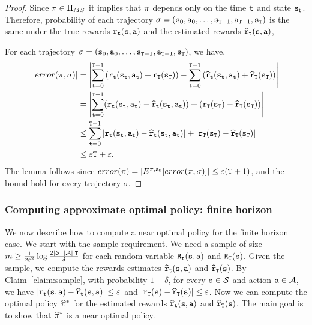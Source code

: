 \begin{proof}
Since $\pi\in  {\Pi _{MS}}$ it implies that $\pi$ depends
only on the time ${\tt t}$ and state ${\tt s}_{\tt t}$.
%
Therefore, probability of each trajectory
$\sigma=({\tt s}_0,{\tt a}_0,\ldots,
{\tt s}_{{\tt T}-1},{\tt a}_{{\tt T}-1},{\tt s}_{\tt T})$ is the
same under the true rewards ${\tt r}_{\tt t}({\tt s},{\tt a})$ and the
estimated rewards $\widehat{{\tt r}}_{\tt t}({\tt s},{\tt a})$,

For each trajectory $\sigma=({\tt s}_0,{\tt a}_0,\ldots,
{\tt s}_{{\tt T}-1},{\tt a}_{{\tt T}-1},{\tt s}_{\tt T})$, we
have,
\begin{align*}
\left|error(\pi,\sigma)\right| &= \left|\sum_{{\tt t}=0}^{{\tt T}-1}
\left({\tt r}_{\tt t}({\tt s}_{\tt t},{\tt a}_{\tt t})+{\tt r}_{\tt T}({\tt s}_{\tt T})\right)
-\sum_{{\tt t}=0}^{{\tt T}-1}
\left(\widehat{{\tt r}}_{\tt t}({\tt s}_{\tt t},{\tt a}_{\tt t})+\widehat{{\tt r}}_{\tt T}({\tt s}_{\tt T})\right)\right| \\
&= \left|\sum_{{\tt t}=0}^{{\tt T}-1}
({\tt r}_{\tt t}({\tt s}_{\tt t},{\tt a}_{\tt t})-\widehat{{\tt r}}_{\tt t}({\tt s}_{\tt t},{\tt a}_{\tt t}))
+
({\tt r}_{\tt T}({\tt s}_{\tt T})-\widehat{{\tt r}}_{\tt T}({\tt s}_{\tt T}))\right|\\
&\leq \sum_{{\tt t}=0}^{{\tt T}-1}
|{\tt r}_{\tt t}({\tt s}_{\tt t},{\tt a}_{\tt t})-\widehat{{\tt r}}_{\tt t}({\tt s}_{\tt t},{\tt a}_{\tt t})|
+
|{\tt r}_{\tt T}({\tt s}_{\tt T})-\widehat{{\tt r}}_{\tt T}({\tt s}_{\tt T})|\\
&\leq \varepsilon {\tt T} +\varepsilon .
\end{align*}
The lemma follows since
$error(\pi)=|E^{\pi,{\tt s}_0}[error(\pi,\sigma)]|\leq
\varepsilon({\tt T}+1)$, and the bound hold for every trajectory
$\sigma$.
\end{proof}

\subsubsection{Computing approximate optimal policy: finite horizon}

We now describe how to compute a near optimal policy for the finite
horizon case. We start with the sample requirement. We need a sample
of size $m\geq \frac{1}{2\varepsilon^2}\log
\frac{2|\mathcal{S}|\;|\mathcal{A}|\; {\tt T}}{\delta}$ for each random
variable ${\tt R}_{\tt t}({\tt s},{\tt a})$ and
${\tt R}_{\tt T}({\tt s})$. Given the sample, we compute the
rewards estimates $\widehat{{\tt r}}_{\tt t}({\tt s},{\tt a})$ and
$\widehat{{\tt r}}_{\tt T}({\tt s})$. By Claim~\ref{claim:sample},
with probability $1-\delta$, for every ${\tt s}\in\mathcal{S}$ and action
${\tt a} \in\mathcal{A}$, we have
$|{\tt r}_{\tt t}({\tt s},{\tt a})-\widehat{{\tt r}}_{\tt t}({\tt s},{\tt a})|\leq
\varepsilon$ and
$|{\tt r}_{\tt T}({\tt s})-\widehat{{\tt r}}_{\tt T}({\tt s})|\leq\varepsilon$.
Now we can compute the optimal policy $\widehat{\pi}^*$ for the
estimated rewards $\widehat{{\tt r}}_{\tt t}({\tt s},{\tt a})$ and
$\widehat{{\tt r}}_{\tt T}({\tt s})$. The main goal is to show that
$\widehat{\pi}^*$ is a near optimal policy.

